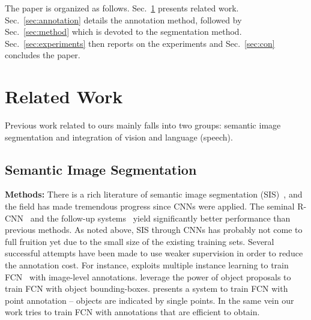 \documentclass[runningheads]{llncs}
\begin{document}
The paper is organized as follows. Sec.~\ref{sec:related} presents
related work. Sec.~\ref{sec:annotation} details the
annotation method, followed by Sec.~\ref{sec:method} which is devoted
to the segmentation method. Sec.~\ref{sec:experiments} then reports on the
experiments and Sec.~\ref{sec:con} concludes the paper.


\section{Related Work}
\label{sec:related}

Previous work related to ours mainly falls into two groups:
semantic image segmentation and integration of
vision and language (speech).

\subsection{Semantic Image Segmentation}
\textbf{Methods:} There is a rich literature of semantic image
segmentation (SIS)~\citep{texton:boost, fully-crf}, and the field has
made tremendous progress since CNNs were applied. The seminal
R-CNN~\citep{rcnn} and the follow-up systems~\citep{Long_2015_CVPR,
  rcnn_crf, crfasrnn} yield significantly better performance than
previous methods. As noted above, SIS through CNNs has probably not come
to full fruition yet due to the small size of the existing training
sets. Several successful attempts have been made to use weaker
supervision in order to reduce the annotation cost.  For instance,
\citep{cnn:mil} exploits multiple instance learning to train
FCN~\citep{Long_2015_CVPR} with image-level annotations. \citep{cnn:em,
  BoxSup, ConsCNN} leverage the power of object proposals to train FCN
with object bounding-boxes. \citep{whatpoint} presents a system to
train FCN with point annotation -- objects are indicated by single
points.  In the same vein our work tries to train FCN with annotations
that are efficient to obtain. 
\end{document}
